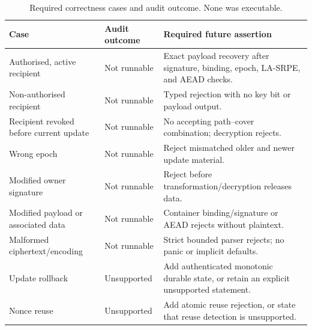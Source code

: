 \begin{table}[t]
\caption{Required correctness cases and audit outcome. None was executable.}
\label{tab:repo-correctness-tests}
\centering
\small
\begin{tabular}{p{}p{}p{}}
\toprule
Case & Audit outcome & Required future assertion \\
\midrule
Authorised, active recipient & Not runnable & Exact payload recovery after signature, binding, epoch, LA-SRPE, and AEAD checks. \\
Non-authorised recipient & Not runnable & Typed rejection with no key bit or payload output. \\
Recipient revoked before current update & Not runnable & No accepting path--cover combination; decryption rejects. \\
Wrong epoch & Not runnable & Reject mismatched older and newer update material. \\
Modified owner signature & Not runnable & Reject before transformation/decryption releases data. \\
Modified payload or associated data & Not runnable & Container binding/signature or AEAD rejects without plaintext. \\
Malformed ciphertext/encoding & Not runnable & Strict bounded parser rejects; no panic or implicit defaults. \\
Update rollback & Unsupported & Add authenticated monotonic durable state, or retain an explicit unsupported statement. \\
Nonce reuse & Unsupported & Add atomic reuse rejection, or state that reuse detection is unsupported. \\
\bottomrule
\end{tabular}
\end{table}

